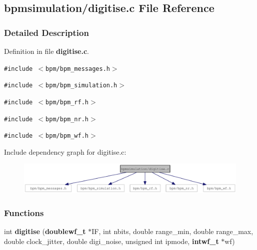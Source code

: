 \subsection{bpmsimulation/digitise.c File Reference}
\label{digitise_8c}


\subsubsection{Detailed Description}


Definition in file {\bf digitise.c}.

{\tt \#include $<$bpm/bpm\_\-messages.h$>$}\par
{\tt \#include $<$bpm/bpm\_\-simulation.h$>$}\par
{\tt \#include $<$bpm/bpm\_\-rf.h$>$}\par
{\tt \#include $<$bpm/bpm\_\-nr.h$>$}\par
{\tt \#include $<$bpm/bpm\_\-wf.h$>$}\par


Include dependency graph for digitise.c:\nopagebreak
\begin{figure}[H]
\begin{center}
\leavevmode
\includegraphics[width=336pt]{digitise_8c__incl}
\end{center}
\end{figure}
\subsubsection*{Functions}
\begin{CompactItemize}
\item 
int {\bf digitise} ({\bf doublewf\_\-t} $\ast$IF, int nbits, double range\_\-min, double range\_\-max, double clock\_\-jitter, double digi\_\-noise, unsigned int ipmode, {\bf intwf\_\-t} $\ast$wf)
\end{CompactItemize}
